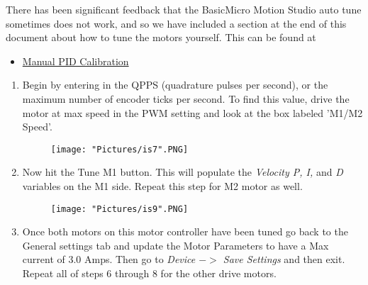 \documentclass[12pt]{article}
\begin{document}
\begin{enumerate}
	\noindent There has been significant feedback that the BasicMicro Motion Studio auto tune sometimes does not work, and so we have included a section at the end of this document about how to tune the motors yourself. This can be found at 
\begin{itemize}
	\item \hyperref[manual_calibration]{Manual PID Calibration}
\end{itemize}
	\begin{enumerate}
		\item Begin by entering in the QPPS (quadrature pulses per second), or the maximum number of encoder ticks per second. To find this value, drive the motor at max speed in the PWM setting and look at the box labeled 'M1/M2 Speed'.

		\begin{figure}[H]
	 		\centering
			\texttt{[image: "Pictures/is7".PNG]}
	 		\caption{}
		\end{figure}

		\item Now hit the Tune M1 button. This will populate the \textit{Velocity P, I,} and \textit{D} variables on the M1 side. Repeat this step for M2 motor as well.

		\begin{figure}[H]
	 		\centering
			\texttt{[image: "Pictures/is9".PNG]}
	 		\caption{}
		\end{figure}

		\item Once both motors on this motor controller have been tuned go back to the General settings tab and update the Motor Parameters to have a Max current of 3.0 Amps. Then go to \textit{Device $->$ Save Settings} and then exit. Repeat all of steps 6 through 8 for the other drive motors.
	\end{enumerate}


\end{enumerate}
\end{document}
